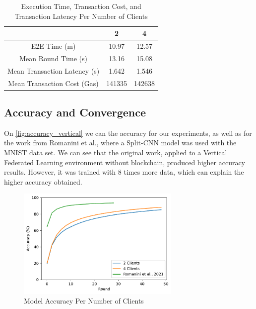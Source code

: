 \begin{table}[!ht]
\begin{tabular}{c|c|c} \hline \hline
                                & 2             & 4             \\ \hline \hline
E2E Time (m)                    & 10.97	        & 12.57         \\ \hline
Mean Round Time (s)             & 13.16	        & 15.08         \\ \hline
Mean Transaction Latency (s)    & 1.642	        & 1.546         \\ \hline
Mean Transaction Cost (Gas)     & 141335        & 142638        \\ \hline
\end{tabular}
\caption{Execution Time, Transaction Cost, and Transaction Latency Per Number of Clients}
\label{tab:metrics_vertical}
\end{table}

\subsection{Accuracy and Convergence}

On \autoref{fig:accuracy_vertical} we can the accuracy for our experiments, as well as for the work \cite{10.48550/arxiv.2104.00489} from Romanini et al., where a Split-CNN model was used with the MNIST data set. We can see that the original work, applied to a Vertical Federated Learning environment without blockchain, produced higher accuracy results. However, it was trained with 8 times more data, which can explain the higher accuracy obtained.

\begin{figure}[!ht]
    \centering
    \centering
    \includegraphics[width=0.7\textwidth]{graphics/vertical/accuracy.pdf}
    \caption{Model Accuracy Per Number of Clients}
    \label{fig:accuracy_vertical}
\end{figure}

